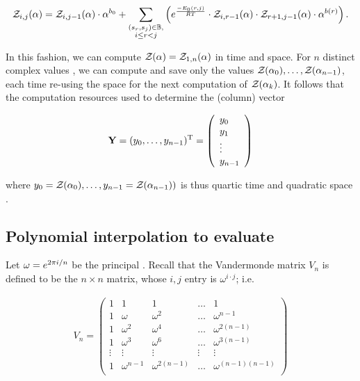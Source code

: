 \begin{align}
\label{eq:fftbor:fftborNussPolyAlpha}
\emZof{i,j}{\alpha} = \emZof{i,j-1}{\alpha} \cdot \alpha^{b_0} +
\sum_{\substack{(s_r,s_j) \in \bpSet, \\ i \le r<j}}
\left(
\boltzNuss{r,j} \cdot
\emZof{i,r-1}{\alpha} \cdot \emZof{r+1,j-1}{\alpha} \cdot \alpha^{b(r)}
\right).
\end{align}

In this fashion, we can compute ${\mathcal Z}_{}(\alpha)={\mathcal Z}_{1,n}(\alpha)$ in
 time and  space. For $n$ distinct complex values
\alphaN, we can compute and save only the
values ${\mathcal Z}_{}(\alpha_0),\dots,{\mathcal Z}_{}(\alpha_{n-1})$, each time re-using the
 space for the next computation of ${\mathcal Z}_{}(\alpha_k)$. It follows that
the computation resources used to determine the (column) vector

\begin{align}
\label{eq:fftbor:yColumn}
\bfY = (y_0,\dots,y_{n-1})^{\text T} =
\left(
\begin{array}{l}
y_0 \\
y_1 \\
\vdots \\
y_{n-1} \\
\end{array}
\right)
\end{align}

where
$y_0={\mathcal Z}_{}(\alpha_0),\dots,y_{n-1}={\mathcal Z}_{}(\alpha_{n-1}))$ is thus quartic time  and quadratic space .

\subsection{Polynomial interpolation to evaluate
\texorpdfstring{}{}}
\label{subsec:fftbor:fft}

Let $\omega = e^{2 \pi i/n}$ be the principal \nRoU.
Recall that the Vandermonde matrix $V_n$ is defined to be the
$n \times n$ matrix, whose $i,j$ entry is $\omega^{i \cdot j}$; i.e.

\begin{align}
\label{eq:fftbor:vandermonde}
V_n =
\left(
\begin{array}{rrrrr}
1 & 1 & 1 & \dots & 1 \\
1 & \omega & \omega^2 & \dots & \omega^{n-1} \\
1 & \omega^2 & \omega^4 & \dots & \omega^{2(n-1)} \\
1 & \omega^3 & \omega^6 & \dots & \omega^{3(n-1)} \\
\vdots & \vdots & \vdots & \vdots & \vdots \\
1 & \omega^{n-1} & \omega^{2(n-1)} & \dots & \omega^{(n-1)(n-1)} \\
\end{array}
\right)
\end{align}


